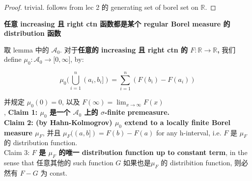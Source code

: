 \documentclass{qlnotes-export}
\begin{document}
\begin{proof}

trivial. follows from lec 2 的 generating set of borel set on \(\mathbb{R}\).

\end{proof}

\begin{theorem}{\textbf{任意 increasing 且 right ctn 函数都是某个 regular Borel measure
的 distribution 函数}}\label{thm-03-distribution-function-lebesgue-stieltjes-measures-increasing-right-ctn-regular-borel-measure-distribution}

取 lemma 中的 \(\mathcal{A}_{0}\). 对于\textbf{任意的 increasing 且 right ctn 的 \(F:{\mathbb{R}}\rightarrow{\mathbb{R}}\),} 我们 define \(\mu_{0}:\mathcal{A}_{0}\rightarrow\lbrack 0,\infty\rbrack\), by:

\[\mu_{0}(\bigcup\limits_{i = 1}^{n}(a_{i},b_{i}\rbrack) = \sum\limits_{i = 1}^{n}(F(b_{i}) - F(a_{i}))\]

并规定 \(\mu_{0}(0) = 0\), 以及 \(F(\infty) = \lim_{x\rightarrow\infty}F(x)\)\\
, \textbf{Claim 1: \(\mu_{0}\) 是一个 \(\mathcal{A}_{0}\) 上的 \(\sigma\)-finite premeasure.}\\
\textbf{Claim 2: (by Hahn-Kolmogrov) \(\mu_{0}\) extend to a locally finite Borel measure \(\mu_{F}\)}, 并且 \(\mu_{F}((a,b\rbrack) = F(b) - F(a)\) for any h-interval, i.e. \(F\) 是 \(\mu_{F}\) 的 distribution function.\\
Claim 3: \textbf{\(F\) 是 \(\mu_{F}\) 的唯一 distribution function up to constant term}, in the sense that 任意其他的 such function \(G\) 如果也是\(\mu_{F}\) 的 distribition function, 则必然有 \(F - G\) 为 const.

\end{theorem}
\end{document}
